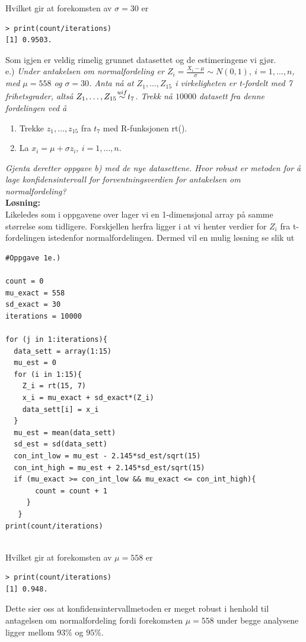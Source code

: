 \documentclass[12pt,
               a4paper,
               article,
               oneside,
               oldfontcommands,
               norsk]{memoir}
\newcommand\myeq{\stackrel{\mathclap{\normalfont{uif}}}{\sim}}
\begin{document}
Hvilket gir at forekomsten av $\sigma = 30$ er 
\begin{verbatim}
> print(count/iterations)
[1] 0.9503.
\end{verbatim}
Som igjen er veldig rimelig grunnet datasettet og de estimeringene vi gjør. \vspace{4mm}\\
e.) \emph{Under antakelsen om normalfordeling er $Z_{i} = \frac{X_i - \mu}{\sigma} \sim N(0,1), \ i = 1,\ldots,n$,
med $\mu = 558$ og $\sigma = 30$. Anta nå at $Z_1,\ldots, Z_{15}$ i virkeligheten er t-fordelt
med 7 frihetsgrader, altså $Z_1, \ldots, Z_{15} \myeq t_7$. Trekk nå $10000$ datasett fra denne fordelingen ved å}
\begin{enumerate}
\item Trekke $z_1 , \ldots , z_{15}$ fra $t_7$ med R-funksjonen rt().
\item La $x_i = \mu + \sigma z_i, \ i=1,\ldots,n$.
\end{enumerate}
\emph{Gjenta deretter oppgave b) med de nye datasettene. Hvor robust er metoden for å lage konfidensintervall for forventningsverdien for antakelsen om normalfordeling?}\vspace{4mm}\\ 
\textbf{Løsning:}\vspace{4mm}\\ 
Likeledes som i oppgavene over lager vi en 1-dimensjonal array på samme størrelse som tidligere. Forskjellen herfra ligger i at vi henter verdier for $Z_{i}$ fra t-fordelingen istedenfor normalfordelingen. Dermed vil en mulig løsning se slik ut 
\begin{lstlisting}
#Oppgave 1e.)

count = 0
mu_exact = 558
sd_exact = 30
iterations = 10000

for (j in 1:iterations){
  data_sett = array(1:15)
  mu_est = 0
  for (i in 1:15){
    Z_i = rt(15, 7)
    x_i = mu_exact + sd_exact*(Z_i)
    data_sett[i] = x_i
  }
  mu_est = mean(data_sett)
  sd_est = sd(data_sett)
  con_int_low = mu_est - 2.145*sd_est/sqrt(15)
  con_int_high = mu_est + 2.145*sd_est/sqrt(15)
  if (mu_exact >= con_int_low && mu_exact <= con_int_high){
       count = count + 1
     }
   }
print(count/iterations)
   
\end{lstlisting}
Hvilket gir at forekomsten av $\mu = 558$ er 
\begin{verbatim}
> print(count/iterations)
[1] 0.948.
\end{verbatim}
Dette sier oss at konfidensintervallmetoden er meget robust i henhold til antagelsen om normalfordeling fordi forekomsten $\mu = 558$ under begge analysene ligger mellom $93 \%$ og $95 \%$. \vspace{4mm}\\
\end{document}
